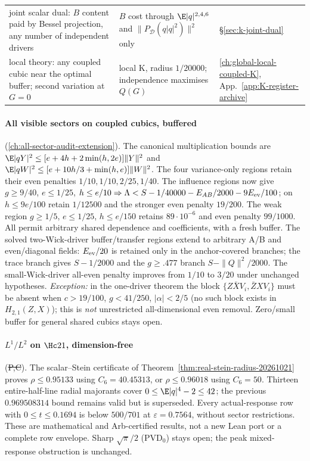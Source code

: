 \begin{center}
\begin{tabular}{p{6.4cm}p{5.2cm}p{2.4cm}}
joint scalar dual: $B$ content paid by Bessel projection, any number of independent drivers & $B$ cost through $\E|q|^{2,4,6}$ and $\|P_{\mathcal D}(q|q|^2)\|^2$ only & \S\ref{sec:k-joint-dual}\\
local theory: any coupled cubic near the optimal buffer; second variation at $G=0$ & local K, radius $1/20000$; independence maximises $Q(G)$ & \autoref{ch:global-local-coupled-K}, App.~\ref{app:K-register-archive}\\\bottomrule
\end{tabular}
\end{center}

\paragraph{All visible sectors on coupled cubics, buffered} (\autoref{ch:all-sector-audit-extension}). The canonical multiplication bounds are
$\E|qY|^2\le[e+4h+2\min(h,2e)]\|Y\|^2$ and
$\E|qW|^2\le[e+10h/3+\min(h,e)]\|W\|^2$.
The four variance-only regions retain their even penalties
$1/10,1/10,2/25,1/40$. The influence regions now give
$g\ge9/40$, $e\le1/25$, $h\le e/10\Rightarrow
\Lambda<S-1/40000-E_{AB}/2000-9E_{\rm ev}/100$;
on $h\le9e/100$ retain $1/12500$ and the stronger even penalty
$19/200$. The weak region $g\ge1/5$, $e\le1/25$, $h\le e/150$
retains $89\cdot10^{-6}$ and even penalty $99/1000$.
All permit arbitrary shared dependence and coefficients, with a fresh buffer.
The solved two-Wick-driver buffer/transfer regions extend to arbitrary A/B and
even/diagonal fields: $E_{\rm ev}/20$ is retained only in the anchor-covered branches; the trace branch gives $S-1/2000$ and the $g\ge.477$ branch $S-\|Q\|^2/2000$. The
small-Wick-driver all-even penalty improves from $1/10$ to $3/20$ under unchanged hypotheses. \emph{Exception:} in the one-driver theorem the block
$\{Z\bar XV_i,\bar ZXV_i\}$ must be absent when $c>19/100$, $g<41/250$, $|\alpha|<2/5$ (no such block exists in $H_{2,1}(Z,X)$); this is \emph{not} unrestricted
all-dimensional even removal. Zero/small buffer for general shared cubics stays open.

\paragraph{$L^1/L^2$ on $\Hc21$, dimension-free} (\st{P,C}).
The scalar--Stein certificate of Theorem~\ref{thm:real-stein-radius-20261021}
proves $\rho\le0.95133$ using $C_6=40.45313$, or $\rho\le0.96018$
using $C_6=50$. Thirteen entire-half-line radial majorants cover
$0\le\E|q|^4-2\le42$; the previous $0.969508314$ bound remains valid
but is superseded. Every actual-response row with $0\le t\le0.1694$
is below $500/701$ at $\varepsilon=0.7564$, without sector restrictions.
These are mathematical and Arb-certified results, not a new Lean port
or a complete row envelope. Sharp $\sqrt\pi/2$ (PVD$_0$) stays open;
the peak mixed-response obstruction is unchanged.

